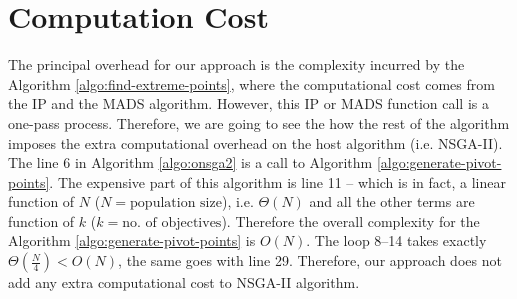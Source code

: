 \documentclass{sig-alternate-05-2015}
\begin{document}
\begin{comment}
Interestingly, this observation once-again confirms the notion of the \textit{generality} in the trade-off solutions, upon which the concept of so-called ``innovization'' \cite{innovization} depends. The ``innovization'' principle deals with finding the most \textit{general} properties from the solutions on the true-PF, and such properties are again utilized to construct better designs. In this case, our solution generation scheme inadvertently uses this principle to generate non-dominated solutions. For example, in the case of ZDT4 problem, the total number of variable is 10; among them, the first variable dictates the trade-off on the Pareto-front, all the solutions on the true-PF has same variable values from variable 2 to 10 which is a solution to Rastrigin's problem. Therefore, if we can locate at least one solution on the true-PF, any solution on its vicinity will share the similar variable values that is the solution to Rastrigin's problem. By following the same argument, we can assume that if we perturb the pivot solution on the true-PF, we supposed to get other non-dominated solutions, however such technique has been already discussed in the sub-section \ref{subsec:nsga2re}, and we have seen that such approach does not work well. Therefore, our approach offers an informative and a deterministic way to utilize this \textit{Pareto-set generality} to generate other solutions on the true-PF.
\end{comment}

\section{Computation Cost}
\label{sec:big-o}
The principal overhead for our approach is the complexity incurred by the Algorithm \ref{algo:find-extreme-points}, where the computational cost comes from the IP and the MADS algorithm. However, this IP or MADS function call is a one-pass process. Therefore, we are going to see the how the rest of the algorithm imposes the extra computational overhead on the host algorithm (i.e. NSGA-II). The line 6 in Algorithm \ref{algo:onsga2} is a call to Algorithm \ref{algo:generate-pivot-points}. The expensive part of this algorithm is line 11 -- which is in fact, a linear function of \(N\) (\(N = \text{population size}\)), i.e. \(\Theta(N)\) and all the other terms are function of \(k\) (\(k = \text{no. of objectives}\)). Therefore the overall complexity for the Algorithm \ref{algo:generate-pivot-points} is \(O(N)\). The loop 8--14 takes exactly \(\Theta(\frac{N}{4}) < O(N)\), the same goes with line 29. Therefore, our approach does not add any extra computational cost to NSGA-II algorithm.
\end{document}
